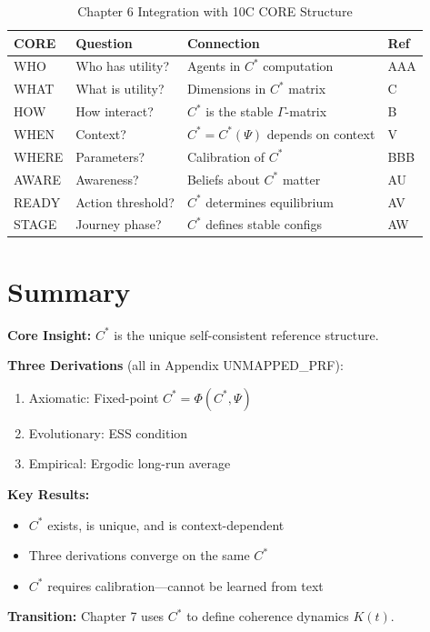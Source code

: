 \begin{table}[htbp]
\centering
\caption{Chapter 6 Integration with 10C CORE Structure}
\label{tab:ch6-9c-integration}
\small
\begin{tabular}{@{}llp{5cm}l@{}}
\toprule
\textbf{CORE} & \textbf{Question} & \textbf{Connection} & \textbf{Ref} \\
\midrule
\cellcolor{purple!20}WHO & Who has utility? & Agents in $C^*$ computation & AAA \\
\cellcolor{red!20}WHAT & What is utility? & Dimensions in $C^*$ matrix & C \\
\cellcolor{blue!20}HOW & How interact? & $C^*$ is the stable $\Gamma$-matrix & B \\
\cellcolor{green!20}WHEN & Context? & $C^* = C^*(\Psi)$ depends on context & V \\
\cellcolor{gray!20}WHERE & Parameters? & Calibration of $C^*$ & BBB \\
\cellcolor{orange!20}AWARE & Awareness? & Beliefs about $C^*$ matter & AU \\
\cellcolor{violet!20}READY & Action threshold? & $C^*$ determines equilibrium & AV \\
\cellcolor{teal!20}STAGE & Journey phase? & $C^*$ defines stable configs & AW \\
\bottomrule
\end{tabular}
\end{table}



\section{Summary}
\label{sec:cstar-summary}

\begin{tcolorbox}[
    colback=blue!5!white,
    colframe=blue!75!black,
    title={\textbf{Chapter 6 Summary}}
]
\textbf{Core Insight:} $C^*$ is the unique self-consistent reference structure.

\textbf{Three Derivations} (all in Appendix UNMAPPED_PRF):
\begin{enumerate}[nosep]
    \item Axiomatic: Fixed-point $C^* = \Phi(C^*, \Psi)$
    \item Evolutionary: ESS condition
    \item Empirical: Ergodic long-run average
\end{enumerate}

\textbf{Key Results:}
\begin{itemize}[nosep]
    \item $C^*$ exists, is unique, and is context-dependent
    \item Three derivations converge on the same $C^*$
    \item $C^*$ requires calibration---cannot be learned from text
\end{itemize}

\textbf{Transition:} Chapter 7 uses $C^*$ to define coherence dynamics $K(t)$.
\end{tcolorbox}

